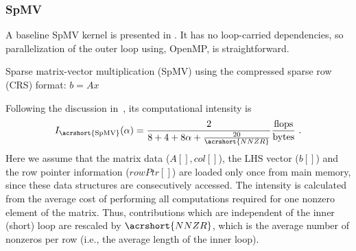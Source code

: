 \subsubsection{\acrshort{SpMV}}
A baseline \acrshort{SpMV} kernel is presented in . It has no loop-carried dependencies, so parallelization of the outer loop using, \eg OpenMP, is straightforward. 
\begin{algorithm}[tbp]
	\caption{Sparse matrix-vector multiplication (\acrshort{SpMV}) using the compressed sparse row (\acrshort{CRS}) format: $b=A x$} 
	\label{alg:SpMV}
	\begin{algorithmic}[1]
			\ENDFOR
		\ENDFOR
	\end{algorithmic}
\end{algorithm}
Following the discussion in~\cite{Moritz_sell}, its computational intensity is
\begin{equation}
\label{eq:SpMV_intensity}
I_\mathrm{\acrshort{SpMV}} (\alpha)= \frac{2}{8+4+8\alpha+\frac{20}{\acrshort{NNZR}}} \frac{\FLOP}{\BYTE}\eos
\end{equation}
Here we assume that the matrix data  ($A[], col[]$), the LHS vector ($b[]$) and the row pointer information ($rowPtr[]$) are loaded only once from main memory, since these data structures are consecutively accessed. The intensity is calculated from the average cost of performing all computations required for one nonzero element of the matrix. Thus, contributions which are independent of the inner (short) loop are rescaled by $\acrshort{NNZR}$, which is the average number of nonzeros per row (i.e., the average length of the inner loop). 

